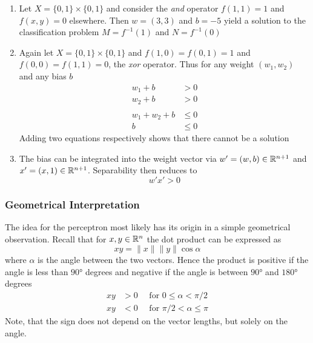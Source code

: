 \begin{examples}
    \hfill
    \begin{enumerate}
        \item Let \( X = \{ 0, 1 \} \times \{ 0, 1 \} \) and consider the \emph{and} operator
              \( f(1, 1) = 1 \) and \( f(x, y) = 0 \) elsewhere. Then \( w = (3, 3) \) and \( b = -5 \)
              yield a solution to the classification problem \( M = f^{-1}(1) \) and \( N = f^{-1}(0) \)
        \item Again let \( X = \{ 0, 1 \} \times \{ 0, 1 \} \) and \( f(1, 0) = f(0, 1) = 1 \) and
              \( f(0, 0) = f(1, 1) = 0 \), the \emph{xor} operator. Thus for any weight \( (w_1, w_2) \) and
              any bias \( b \)
              \[
                  \begin{split}
                      w_1 + b & > 0 \\
                      w_2 + b & > 0 \\
                      \\
                      w_1 + w_2 + b & \le 0 \\
                      b & \le 0
                  \end{split}
              \]
              Adding two equations respectively shows that there cannot be a solution
        \item The bias can be integrated into the weight vector via \( w' = (w, b) \in \mathbb{R}^{n + 1} \) and
              \( x' = (x, 1) \in \mathbb{R}^{n + 1} \). Separability then reduces to
              \[
                  w'x' > 0
              \]
    \end{enumerate}
\end{examples}
\bigskip


\subsubsection*{Geometrical Interpretation}
The idea for the perceptron most likely has its origin in a simple geometrical observation.
Recall that for \( x, y \in \mathbb{R}^n \) the dot product can be expressed as
\[
    xy = \|x\| \|y\| \cos\alpha
\]
where \( \alpha \) is the angle between the two vectors. Hence the product is positive
if the angle is less than \( \ang{90} \) degrees and negative if the angle is between \( \ang{90} \)
and \( \ang{180} \) degrees
\[
    \begin{split}
        xy & > 0 \hspace{1em}\text{ for } 0 \le \alpha < \pi / 2 \\
        xy & < 0 \hspace{1em}\text{ for } \pi / 2 < \alpha \le \pi
    \end{split}
\]
Note, that the sign does not depend on the vector lengths, but solely on the angle.

